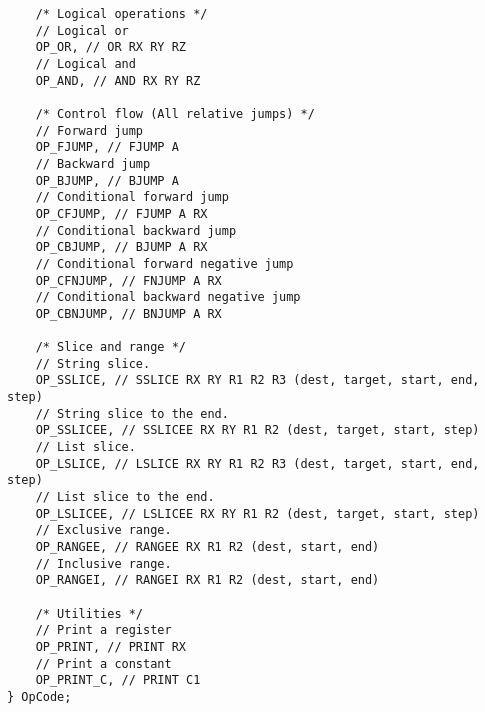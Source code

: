 \begin{code}
\begin{verbatim}
    /* Logical operations */
    // Logical or
    OP_OR, // OR RX RY RZ
    // Logical and
    OP_AND, // AND RX RY RZ

    /* Control flow (All relative jumps) */
    // Forward jump
    OP_FJUMP, // FJUMP A
    // Backward jump
    OP_BJUMP, // BJUMP A
    // Conditional forward jump
    OP_CFJUMP, // FJUMP A RX
    // Conditional backward jump
    OP_CBJUMP, // BJUMP A RX
    // Conditional forward negative jump
    OP_CFNJUMP, // FNJUMP A RX
    // Conditional backward negative jump
    OP_CBNJUMP, // BNJUMP A RX

    /* Slice and range */
    // String slice.
    OP_SSLICE, // SSLICE RX RY R1 R2 R3 (dest, target, start, end, step)
    // String slice to the end.
    OP_SSLICEE, // SSLICEE RX RY R1 R2 (dest, target, start, step)
    // List slice.
    OP_LSLICE, // LSLICE RX RY R1 R2 R3 (dest, target, start, end, step)
    // List slice to the end.
    OP_LSLICEE, // LSLICEE RX RY R1 R2 (dest, target, start, step)
    // Exclusive range.
    OP_RANGEE, // RANGEE RX R1 R2 (dest, start, end)
    // Inclusive range.
    OP_RANGEI, // RANGEI RX R1 R2 (dest, start, end)

    /* Utilities */
    // Print a register
    OP_PRINT, // PRINT RX
    // Print a constant
    OP_PRINT_C, // PRINT C1
} OpCode;
\end{verbatim}
\end{code}
